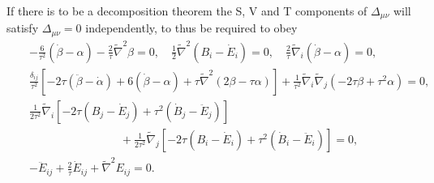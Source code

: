 If there is to be a decomposition theorem the S, V and T components of $\Delta_{\mu\nu}$ will satisfy $\Delta_{\mu\nu}=0$ independently, to thus be required to obey
%
\begin{eqnarray}
&&-\frac{6}{\tau^2}(\dot{\beta}-\alpha)-\frac{2}{\tau}\tilde{\nabla}^2\beta=0,\quad \frac{1}{2}\tilde{\nabla}^2(B_i-\dot{E}_i)=0, \quad \frac{2}{\tau}\tilde{\nabla}_i(\dot{\beta}-\alpha)=0,
\nonumber\\
&&\frac{\delta_{ij}}{\tau^2}\left[-2\tau(\ddot{\beta}-\dot{\alpha})+6(\dot{\beta}-\alpha)+\tau \tilde{\nabla}^2(2\beta-\tau\alpha)\right]+ \frac{1}{\tau^2}\tilde{\nabla}_i\tilde{\nabla}_j(-2\tau \beta +\tau^2\alpha)=0,
\nonumber\\
&&\frac{1}{2\tau^2}\tilde{\nabla}_i[-2\tau (B_j-\dot{E}_j)+\tau^2(\dot{B}_j-\ddot{E}_j)]
\nonumber\\
&&\qquad\qquad\qquad\qquad+\frac{1}{2\tau^2}\tilde{\nabla}_j[-2\tau (B_i-\dot{E}_i)+\tau^2(\dot{B}_i-\ddot{E}_i)]=0,
\nonumber\\
&&-\ddot{E}_{ij}+\frac{2}{\tau}\dot{E}_{ij}+\tilde{\nabla}^2E_{ij}=0.
\label{7.8}
\end{eqnarray}
%

